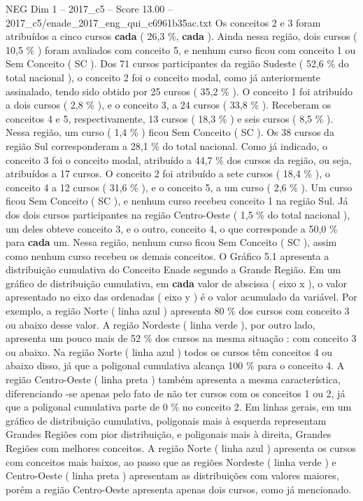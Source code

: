 \begin{textsample}{NEG Dim 1 – 2017\_c5 – Score 13.00 – 2017\_c5/enade\_2017\_eng\_qui\_c6961b35ac.txt}
Os conceitos 2 e 3 foram atribuídos a cinco cursos \textbf{cada} ( 26,3 \%, \textbf{cada} ).
Ainda nessa região, dois cursos ( 10,5 \% ) foram avaliados com conceito 5, e nenhum curso ficou com conceito 1 ou Sem Conceito ( SC ).
Dos 71 cursos participantes da região Sudeste ( 52,6 \% do total nacional ), o conceito 2 foi o conceito modal, como já anteriormente assinalado, tendo sido obtido por 25 cursos ( 35,2 \% ).
O conceito 1 foi atribuído a dois cursos ( 2,8 \% ), e o conceito 3, a 24 cursos ( 33,8 \% ).
Receberam os conceitos 4 e 5, respectivamente, 13 cursos ( 18,3 \% ) e seis cursos ( 8,5 \% ).
Nessa região, um curso ( 1,4 \% ) ficou Sem Conceito ( SC ).
Os 38 cursos da região Sul corresponderam a 28,1 \% do total nacional.
Como já indicado, o conceito 3 foi o conceito modal, atribuído a 44,7 \% dos cursos da região, ou seja, atribuídos a 17 cursos.
O conceito 2 foi atribuído a sete cursos ( 18,4 \% ), o conceito 4 a 12 cursos ( 31,6 \% ), e o conceito 5, a um curso ( 2,6 \% ).
Um curso ficou Sem Conceito ( SC ), e nenhum curso recebeu conceito 1 na região Sul.
Já dos dois cursos participantes na região Centro-Oeste ( 1,5 \% do total nacional ), um deles obteve conceito 3, e o outro, conceito 4, o que corresponde a 50,0 \% para \textbf{cada} um.
Nessa região, nenhum curso ficou Sem Conceito ( SC ), assim como nenhum curso recebeu os demais conceitos.
O Gráfico 5.1 apresenta a distribuição cumulativa do Conceito Enade segundo a Grande Região.
Em um gráfico de distribuição cumulativa, em \textbf{cada} valor de abscissa ( eixo x ), o valor apresentado no eixo das ordenadas ( eixo y ) é o valor acumulado da variável.
Por exemplo, a região Norte ( linha azul ) apresenta 80 \% dos cursos com conceito 3 ou abaixo desse valor.
A região Nordeste ( linha verde ), por outro lado, apresenta um pouco mais de 52 \% dos cursos na mesma situação : com conceito 3 ou abaixo.
Na região Norte ( linha azul ) todos os cursos têm conceitos 4 ou abaixo disso, já que a poligonal cumulativa alcança 100 \% para o conceito 4.
A região Centro-Oeste ( linha preta ) também apresenta a mesma característica, diferenciando -se apenas pelo fato de não ter cursos com os conceitos 1 ou 2, já que a poligonal cumulativa parte de 0 \% no conceito 2.
Em linhas gerais, em um gráfico de distribuição cumulativa, poligonais mais à esquerda representam Grandes Regiões com pior distribuição, e poligonais mais à direita, Grandes Regiões com melhores conceitos.
A região Norte ( linha azul ) apresenta os cursos com conceitos mais baixos, ao passo que as regiões Nordeste ( linha verde ) e Centro-Oeste ( linha preta ) apresentam as distribuições com valores maiores, porém a região Centro-Oeste apresenta apenas dois cursos, como já mencionado.

\end{textsample}
